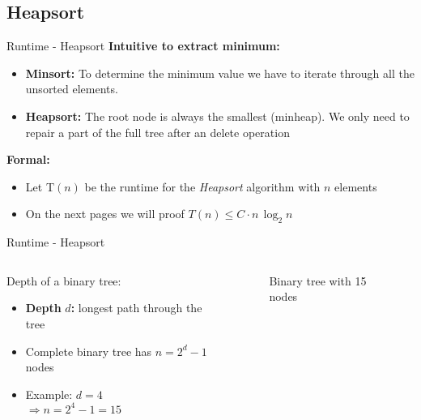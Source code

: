 \subsection{Heapsort}

\begin{frame}{Runtime - Heapsort}
  \textbf{Intuitive to extract minimum:}
  \begin{itemize}
    \item<1- |handout:1>
      \textbf{Minsort:}
      To determine the minimum value we have to iterate through all the
      unsorted elements.
    \item<2- |handout:1>
      \textbf{Heapsort:}
      The root node is always the smallest (minheap).
      We only need to repair a part of the full tree after an delete
      operation
  \end{itemize}
  \textbf{Formal:}
  \begin{itemize}
    \item<4- |handout:1>
      Let {\color{MainA}T$(n)$} be the runtime for the \textit{Heapsort}
      algorithm with {\color{MainA}$n$} elements
    \item<5- |handout:1>
      On the next pages we will proof
      {\color{MainA}$T(n) \leq C \cdot n \, \log_2 n$}
  \end{itemize}
\end{frame}


\begin{frame}{Runtime - Heapsort}
  \begin{columns}
    \begin{column}{0.5\textwidth}
      Depth of a binary tree:
      \begin{itemize}
        \item
          \textbf{Depth} {\color{MainA}$d$}\textbf{:}
          longest path through the tree
        \item
          Complete binary tree has {\color{MainA}$n = 2^d - 1$} nodes
        \item
          Example: {\color{MainA}$d = 4$}\\
          {\color{MainA}$\Rightarrow n = 2^4 - 1 = 15$}
      \end{itemize}
    \end{column}
    \begin{column}{0.5\textwidth}
      \begin{figure}
        \begin{adjustbox}{width=\linewidth}
        \end{adjustbox}
        \caption{Binary tree with 15 nodes}%
        \label{fig:binary_tree}%
      \end{figure}
    \end{column}
  \end{columns}
\end{frame}